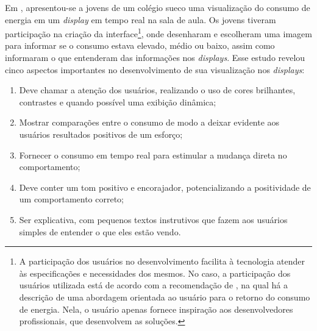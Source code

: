 Em \cite{2012_visualisation_sweden}, apresentou-se a jovens de um
colégio sueco uma visualização do consumo de energia em um
\emph{display} em tempo real na sala de aula. Os jovens tiveram
participação na criação da interface\footnote{A participação dos
usuários no desenvolvimento facilita à tecnologia atender às
especificações e necessidades dos mesmos. No caso, a participação dos
usuários utilizada está de acordo com a recomendação de
\cite{2009_extreme_user_filandia}, na qual há a descrição de uma
abordagem orientada ao usuário para o retorno do consumo de energia.
Nela, o usuário apenas fornece inspiração aos desenvolvedores
profissionais, que desenvolvem as soluções.}, onde desenharam e
escolheram uma imagem para informar se o consumo estava elevado, médio
ou baixo, assim como informaram o que entenderam das informações nos
\emph{displays}.  Esse estudo revelou cinco aspectos importantes no
desenvolvimento de sua visualização nos \emph{displays}:

\begin{enumerate}
\item Deve chamar a atenção dos usuários, realizando o uso de cores brilhantes,
contrastes e quando possível uma exibição dinâmica;
\item Mostrar comparações entre o consumo de modo a deixar evidente aos usuários
resultados positivos de um esforço;
\item Fornecer o consumo em tempo real para estimular a mudança direta no
comportamento;
\item Deve conter um tom positivo e encorajador, potencializando a positividade
de um comportamento correto;
\item Ser explicativa, com pequenos textos instrutivos que fazem aos usuários
simples de entender o que eles estão vendo.
\end{enumerate}

